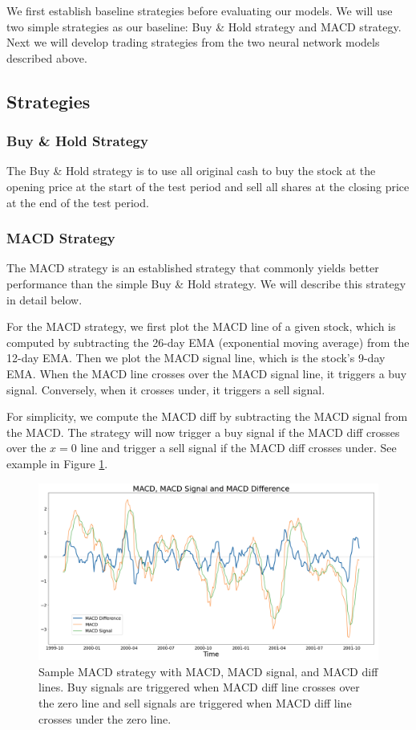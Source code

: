 \documentclass[10pt]{article}
\begin{document}
We first establish baseline strategies before evaluating our models. We will use two simple strategies as our baseline: Buy \& Hold strategy and MACD strategy. Next we will develop trading strategies from the two neural network models described above.

\subsection{Strategies}

\subsubsection{Buy \& Hold Strategy}

The Buy \& Hold strategy is to use all original cash to buy the stock at the opening price at the start of the test period and sell all shares at the closing price at the end of the test period.


\subsubsection{MACD Strategy}

The MACD strategy is an established strategy that commonly yields better performance than the simple Buy \& Hold strategy. We will describe this strategy in detail below.

For the MACD strategy, we first plot the MACD line of a given stock, which is computed by subtracting the 26-day EMA (exponential moving average) from the 12-day EMA. Then we plot the MACD signal line, which is the stock's 9-day EMA. When the MACD line crosses over the MACD signal line, it triggers a buy signal. Conversely, when it crosses under, it triggers a sell signal.

For simplicity, we compute the MACD diff by subtracting the MACD signal from the MACD. The strategy will now trigger a buy signal if the MACD diff crosses over the $x=0$ line and trigger a sell signal if the MACD diff crosses under. See example in Figure \ref{macd}.

\begin{figure}[H]
\centering
\includegraphics[width=\textwidth]{macd}
\caption{Sample MACD strategy with MACD, MACD signal, and MACD diff lines. Buy signals are triggered when MACD diff line crosses over the zero line and sell signals are triggered when MACD diff line crosses under the zero line.}
\label{macd}
\end{figure}
\end{document}
